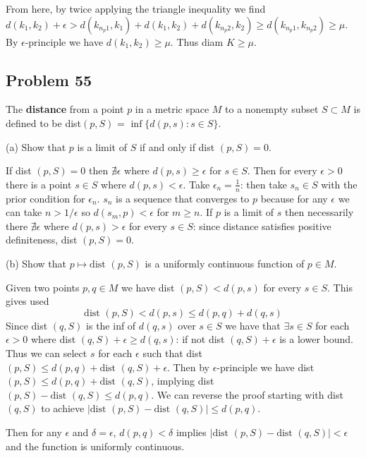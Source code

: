 \documentclass{amsart}
\begin{document}
\medskip

\noindent From here, by twice applying the triangle inequality we find 
$d(k_1, k_2) + \epsilon > d(k_{n_p1}, k_1) + d(k_1, k_2) + d(k_{n_p2}, k_2) \geq d(k_{n_p1}, k_{n_p2})\geq\mu$. By $\epsilon$-principle we have $d(k_1, k_2)\geq\mu$.
Thus diam $K\geq\mu$.

\medskip


\newpage
\subsection*{Problem 55} The \textbf{distance} from a point $p$ in a metric space $M$ to a nonempty subset $S \subset M$ is defined to be 
dist$(p, S)$ = $\inf\{d(p, s) : s \in S\}$.

(a) Show that $p$ is a limit of $S$ if and only if dist $(p,S) = 0$.

\medskip

\noindent If dist $(p,S)=0$ then $\nexists\epsilon$ where $d(p, s)\geq\epsilon$ for $s\in S$. Then for every $\epsilon>0$ there is a point
$s\in S$ where $d(p,s)<\epsilon$. Take $\epsilon_n = \frac{1}{n}$: then take $s_n\in S$ with the prior condition for $\epsilon_n$. $s_n$ is 
a sequence that converges to $p$ because for any $\epsilon$ we can take $n> 1/\epsilon$ so $d(s_m, p)<\epsilon$ for $m\geq n$. If $p$ is a 
limit of $s$ then necessarily there $\nexists \epsilon$ where $d(p,s)>\epsilon$ for every $s\in S$: since distance satisfies positive definiteness,
dist $(p, S)=0$.

\medskip

(b) Show that $p\mapsto \text{dist }(p,S)$ is a uniformly continuous function of $p \in M$. 

\medskip

\noindent Given two points $p, q\in M$ we have dist $(p, S)<d(p,s)$ for every $s\in S$. This gives used
$$\text{dist }(p, S)<d(p,s)\leq d(p,q)+d(q,s)$$
Since dist $(q, S)$ is the inf of $d(q, s)$ over $s\in S$ we have that $\exists s\in S$ for each $\epsilon>0$
where dist $(q, S)+\epsilon\geq d(q, s)$: if not dist $(q, S)+\epsilon$ is a lower bound. Thus we can select $s$
for each $\epsilon$ such that dist $(p, S)\leq d(p, q)+\text{dist }(q, S)+\epsilon$. Then by $\epsilon$-principle
we have dist $(p, S)\leq d(p, q)+\text{dist }(q, S)$, implying dist $(p, S)-\text{dist }(q, S)\leq d(p,q)$.
We can reverse the proof starting with dist $(q, S)$ to achieve $|\text{dist }(p, S)-\text{dist }(q, S)|\leq d(p, q)$.

\medskip \noindent Then for any $\epsilon$ and $\delta = \epsilon$, $d(p,q)<\delta$ implies $|\text{dist }(p, S)-\text{dist }(q, S)|<\epsilon$
and the function is uniformly continuous.
\end{document}
